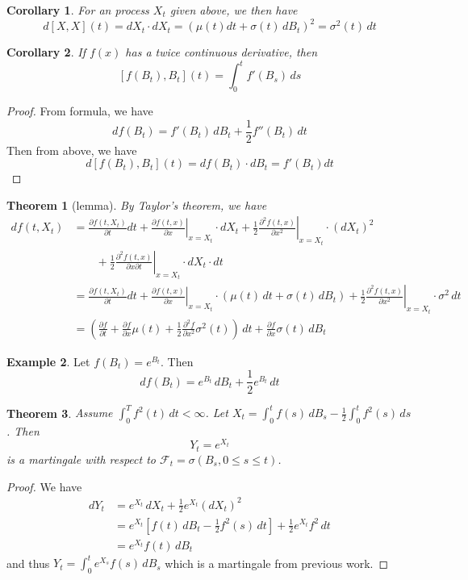 \documentclass[10pt, oneside, reqno]{amsart}
\theoremstyle{plain}%
\newtheorem{thm}{Theorem}[section]
\newtheorem*{cor}{Corollary}
\theoremstyle{definition}
\newtheorem{exmp}[thm]{Example}
\theoremstyle{remark}
\newcommand{\sigf}{\mathcal{F}}
\begin{document}
\begin{cor}
	For an \ito process $X_t$ given above, we then have \[
		d[X,X](t) = dX_t \cdot dX_t = \left(\mu(t) dt + \sigma(t) \, dB_t \right)^2 = \sigma^2(t) \, dt
	\]
\end{cor}
\begin{cor}
	If $f(x)$ has a twice continuous derivative, then \[
	[f(B_t), B_t](t) = \int_0^t f'(B_s) \, ds
	\]
\end{cor}
\begin{proof}
	From \itos formula, we have \[
		df(B_t) = f'(B_t) \, dB_t + \frac{1}{2} f''(B_t) \, dt
	\]  Then from above, we have \[
		d[f(B_t), B_t] (t) = df(B_t) \cdot dB_t	= f'(B_t) dt
	\]
\end{proof}
\begin{thm}[\itos lemma]
	By Taylor's theorem, we have \begin{align*}
		df(t, X_t) &= \frac{\partial f(t, X_t)}{\partial t} dt + \left.\frac{\partial f(t, x)}{\partial x}  \right|_{x = X_t} \cdot dX_t + \left.\frac{1}{2} \frac{\partial^2 f(t, x)}{\partial x^2} \right|_{x = X_t} \cdot (dX_t)^2 \\
		&\qquad + \left.\frac{1}{2} \frac{\partial^2 f(t, x)}{\partial x \partial t} \right|_{x = X_t} \cdot dX_t \cdot dt \\
		&= \frac{\partial f(t, X_t)}{\partial t} dt + \left.\frac{\partial f(t, x)}{\partial x}  \right|_{x = X_t} \cdot (\mu(t) \, dt + \sigma(t) \, dB_t) + \left.\frac{1}{2} \frac{\partial^2 f(t, x)}{\partial x^2} \right|_{x = X_t} \cdot \sigma^2 \, dt \\
		&= \left( \frac{\partial f}{\partial t} + \frac{\partial f}{\partial x} \mu(t) + \frac{1}{2} \frac{\partial^2 f}{\partial x^2} \sigma^2(t) \right) \, dt + \frac{\partial f}{\partial x} \sigma(t) \, dB_t
	\end{align*}
\end{thm}

\begin{exmp}
	Let $f(B_t) = e^{B_t}$. Then \[
		df(B_t) = e^{B_t} \, dB_t + \frac{1}{2} e^{B_t} \, dt
	\]
\end{exmp}

\begin{thm}
	Assume $\int_0^T f^2(t)\, dt < \infty$.  Let $X_t = \int_0^t f(s) \, dB_s - \frac{1}{2}\int_0^t f^2(s) \, ds$.  Then \[
		Y_t = e^{X_t}
	\]  is a martingale with respect to $\sigf_t = \sigma(B_s, 0 \leq s \leq t)$. 
\end{thm}
\begin{proof}
	We have \begin{align*}
		dY_t 	&= e^{X_t} \, dX_t + \frac{1}{2} e^{X_t} (dX_t)^2 \\
				&= e^{X_t}[f(t) \, dB_t - \frac{1}{2} f^2(s) \, dt] + \frac{1}{2} e^{X_t} f^2 \, dt \\
				&= e^{X_t} f(t) \, dB_t
 	\end{align*} and thus $Y_t = \int_0^t e^{X_s} f(s) \, dB_s$ which is a martingale from previous work.
\end{proof}
\end{document}
